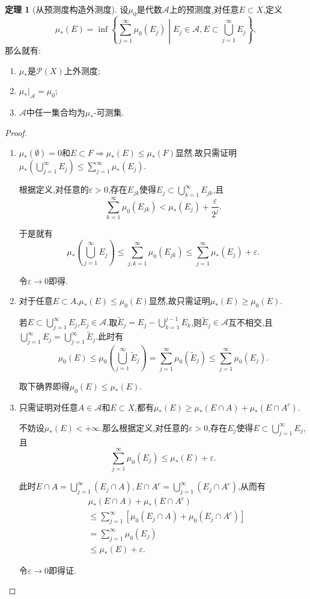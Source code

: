 \documentclass{ctexart}
\theoremstyle{definition}
\newtheorem{theorem}{定理}
\theoremstyle{remark}
\begin{document}
	\begin{theorem}[从预测度构造外测度]
		设$\mu_0$是代数$\mathcal{A}$上的预测度,对任意$E\subset X$,定义
		$$\mu_*(E)=\inf\left\{\sum_{j=1}^\infty{\mu_0(E_j)}\middle|E_j\in\mathcal{A},E\subset\bigcup_{j=1}^\infty{E_j}\right\},$$
		那么就有:
		\begin{enumerate}
			\item $\mu_*$是$\mathcal{P}(X)$上外测度;
			\item $\mu_*|_\mathcal{A}=\mu_0$;
			\item $\mathcal{A}$中任一集合均为$\mu_*$-可测集.
		\end{enumerate}
	\end{theorem}
	\begin{proof}
		\begin{enumerate}
			\item $\mu_*(\emptyset)=0$和$E\subset F\Rightarrow\mu_*(E)\le\mu_*(F)$显然.故只需证明$\mu_*\left(\bigcup_{j=1}^\infty{E_j}\right)\le\sum_{j=1}^\infty{\mu_*(E_j)}$.
			
			根据定义,对任意的$\varepsilon>0$,存在$E_{jk}$使得$E_j\subset\bigcup_{k=1}^\infty{E_{jk}}$,且
			$$\sum_{k=1}^\infty{\mu_0(E_{jk})}<\mu_*(E_j)+\frac{\varepsilon}{2^j}.$$
			
			于是就有
			$$\mu_*\left(\bigcup_{j=1}^\infty{E_j}\right)\le\sum_{j,k=1}^\infty{\mu_0(E_{jk})}\le\sum_{j=1}^\infty{\mu_*(E_j)}+\varepsilon.$$
			
			令$\varepsilon\to 0$即得.
			
			\item 对于任意$E\subset A$,$\mu_*(E)\le\mu_0(E)$显然,故只需证明$\mu_*(E)\ge\mu_0(E)$.
			
			若$E\subset\bigcup_{j=1}^\infty{E_j}$,$E_j\in\mathcal{A}$.取$\widetilde{E}_j=E_j-\bigcup_{k=1}^{j-1}{E_k}$,则$\widetilde{E}_j\in\mathcal{A}$互不相交,且$\bigcup_{j=1}^\infty{E_j}=\bigcup_{j=1}^\infty{\widetilde{E}_j}$.此时有
			$$\mu_0(E)\le\mu_0\left(\bigcup_{j=1}^\infty{\widetilde{E}_j}\right)=\sum_{j=1}^\infty{\mu_0\left(\widetilde{E}_j\right)}\le\sum_{j=1}^\infty{\mu_0(E_j)}.$$
			
			取下确界即得$\mu_0(E)\le\mu_*(E)$.
			
			\item 只需证明对任意$A\in\mathcal{A}$和$E\subset X$,都有$\mu_*(E)\ge\mu_*(E\cap A)+\mu_*(E\cap A^c)$.
			
			不妨设$\mu_*(E)<+\infty$.那么根据定义,对任意的$\varepsilon>0$,存在$E_j$使得$E\subset\bigcup_{j=1}^\infty{E_j}$,且
			$$\sum_{j=1}^\infty{\mu_0(E_j)}\le\mu_*(E)+\varepsilon.$$
			
			此时$E\cap A=\bigcup_{j=1}^\infty{(E_j\cap A)},E\cap A^c=\bigcup_{j=1}^\infty{(E_j\cap A^c)}$,从而有
			\begin{align*}
				& \mu_*(E\cap A)+\mu_*(E\cap A^c) \\
				& \le\sum_{j=1}^\infty{[\mu_0(E_j\cap A)+\mu_0(E_j\cap A^c)]} \\
				& =\sum_{j=1}^\infty{\mu_0(E_j)} \\
				& \le\mu_*(E)+\varepsilon.
			\end{align*}
			
			令$\varepsilon\to 0$即得证.
		\end{enumerate}
	\end{proof}
	
\end{document}
